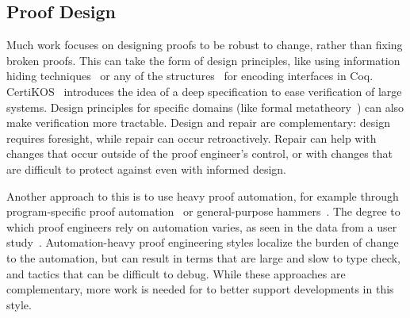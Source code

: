 \iffalse
Chick also has some clear differences from \sysname, aside from operating over the Chick language instead of Gallina itself.
Unlike early versions of \sysname, Chick also applies the changes it finds to derive the new program.
However, Chick does this using a syntactic algorithm that handles simple transformations and does
not provide guarantees on the output; for some changes to inductive types, for example, not all proofs from
the old program are preserved in the new program, and the algorithm may fail %
on this class of changes. \devoid\ focuses on applying these changes for a class of changes like this
with semantic guarantess. %
It may be possible to integrate the techniques from Chick, \sysname, and \devoid\
into the same tool and use them to advance the state of proof repair.
\fi

\subsection*{Proof Design}


Much work focuses on designing proofs
to be robust to change, rather than fixing broken proofs.
This can take the form of design principles, like using 
information hiding techniques~\cite{Woos:2016:PCF:2854065.2854081, Klein:2014:CFV:2584468.2560537}
or any of the structures~\cite{Chrzaszcz2003, Sozeau2008, Saibi:PhD} for encoding interfaces in Coq.
CertiKOS~\cite{certikos} introduces the idea of a deep specification to ease verification of large systems.
Design principles for specific domains (like formal metatheory~\cite{Aydemir2008, Delaware2013POPL, Delaware2013ICFP})
can also make verification more tractable.
Design and repair are complementary: design requires foresight, while repair can occur retroactively.
Repair can help with changes that occur outside of the proof engineer's control,
or with changes that are difficult to protect against even with informed design.

Another approach to this is to use heavy proof automation, for example through
program-specific proof automation~\cite{Chlipala:2013:CPD:2584504}
or general-purpose hammers~\cite{Blanchette2016b, Blanchette2013, Kaliszyk2014, Czajka2018}.
The degree to which proof engineers rely on automation varies, as seen in the data from a user study~\cite{replica}.
Automation-heavy proof engineering styles localize the burden of change to the automation,
but can result in terms that are large and slow to type check,
and tactics that can be difficult to debug.
While these approaches are complementary, more work is needed for \toolname to better support 
developments in this style.

